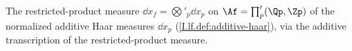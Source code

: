 The restricted-product measure $\dd x_f=\bigotimes'_p\dd x_p$ on $\Af=\prod'_p(\Qp,\Zp)$ of the normalized additive Haar measures $\dd x_p$ (\cref{I.lf.def:additive-haar}), via the additive transcription of the restricted-product measure.
